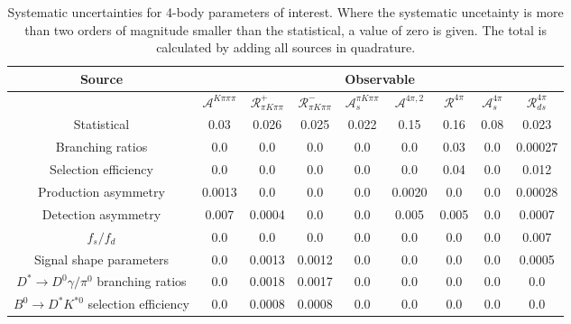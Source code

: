 \begin{sidewaystable}
  \centering
  \begin{tabular}{ccccccccc}
      \toprule
      Source & \multicolumn{8}{c}{Observable} \\
      \midrule
       & $\mathcal{A}^{K\pi\pi\pi}$ & $\mathcal{R}_{\pi K\pi\pi}^+$ & $\mathcal{R}_{\pi K\pi\pi}^-$ & $\mathcal{A}_s^{\pi K\pi\pi}$ & $\mathcal{A}^{4\pi,2}$ & $\mathcal{R}^{4\pi}$ & $\mathcal{A}_s^{4\pi}$ & $\mathcal{R}_{ds}^{4\pi}$ \\
      \midrule
      Statistical & 0.03 & 0.026 & 0.025 & 0.022 & 0.15 & 0.16 & 0.08 & 0.023 \\
      \midrule
      Branching ratios & 0.0  & 0.0  & 0.0  & 0.0  & 0.0  & 0.03 & 0.0  & 0.00027 \\
      Selection efficiency & 0.0  & 0.0  & 0.0  & 0.0  & 0.0  & 0.04 & 0.0  & 0.012 \\
      Production asymmetry & 0.0013 & 0.0  & 0.0  & 0.0  & 0.0020 & 0.0  & 0.0  & 0.00028 \\
      Detection asymmetry & 0.007 & 0.0004 & 0.0  & 0.0  & 0.005 & 0.005 & 0.0  & 0.0007 \\
      $f_s/f_d$ & 0.0  & 0.0  & 0.0  & 0.0  & 0.0  & 0.0  & 0.0  & 0.007 \\
      Signal shape parameters & 0.0  & 0.0013 & 0.0012 & 0.0  & 0.0  & 0.0  & 0.0  & 0.0005 \\
      $D^* \to D^0 \gamma/\pi^0$ branching ratios & 0.0  & 0.0018 & 0.0017 & 0.0  & 0.0  & 0.0  & 0.0  & 0.0  \\
      $B^0 \to D^* K^{*0}$ selection efficiency & 0.0  & 0.0008 & 0.0008 & 0.0  & 0.0  & 0.0  & 0.0  & 0.0  \\
      \bottomrule
  \end{tabular}
  \caption{Systematic uncertainties for 4-body parameters of interest. Where the systematic uncetainty is more than two orders of magnitude smaller than the statistical, a value of zero is given. The total is calculated by adding all sources in quadrature.}
\label{tab:fourBody_systematics}
\end{sidewaystable}
